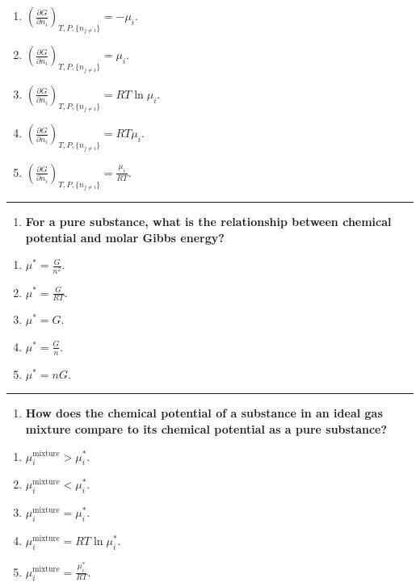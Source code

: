 \documentclass[
  9pt,
]{extbook}
\providecommand{\tightlist}{%
  \setlength{\itemsep}{0pt}\setlength{\parskip}{0pt}}
\theoremstyle{definition}
\theoremstyle{definition}
\theoremstyle{definition}
\theoremstyle{definition}
\theoremstyle{remark}
\begin{document}
\begin{enumerate}
\def\labelenumi{\alph{enumi}.}
\tightlist
\item
  \(\left(\frac{\partial G}{\partial n_i}\right)_{T,P,\{n_{j\neq i}\}} = -\mu_i\).
\item
  \(\left(\frac{\partial G}{\partial n_i}\right)_{T,P,\{n_{j\neq i}\}} = \mu_i\).
\item
  \(\left(\frac{\partial G}{\partial n_i}\right)_{T,P,\{n_{j\neq i}\}} = RT\ln\mu_i\).
\item
  \(\left(\frac{\partial G}{\partial n_i}\right)_{T,P,\{n_{j\neq i}\}} = RT\mu_i\).
\item
  \(\left(\frac{\partial G}{\partial n_i}\right)_{T,P,\{n_{j\neq i}\}} = \frac{\mu_i}{RT}\).
\end{enumerate}

\begin{center}\rule{0.5\linewidth}{0.5pt}\end{center}

\begin{enumerate}
\def\labelenumi{\arabic{enumi}.}
\setcounter{enumi}{7}
\tightlist
\item
  \textbf{For a pure substance, what is the relationship between chemical potential and molar Gibbs energy?}
\end{enumerate}

\begin{enumerate}
\def\labelenumi{\alph{enumi}.}
\tightlist
\item
  \(\mu^* = \frac{G}{n^2}\).
\item
  \(\mu^* = \frac{G}{RT}\).
\item
  \(\mu^* = G\).
\item
  \(\mu^* = \frac{G}{n}\).
\item
  \(\mu^* = nG\).
\end{enumerate}

\begin{center}\rule{0.5\linewidth}{0.5pt}\end{center}

\begin{enumerate}
\def\labelenumi{\arabic{enumi}.}
\setcounter{enumi}{8}
\tightlist
\item
  \textbf{How does the chemical potential of a substance in an ideal gas mixture compare to its chemical potential as a pure substance?}
\end{enumerate}

\begin{enumerate}
\def\labelenumi{\alph{enumi}.}
\tightlist
\item
  \(\mu_i^{\text{mixture}} > \mu_i^*\).
\item
  \(\mu_i^{\text{mixture}} < \mu_i^*\).
\item
  \(\mu_i^{\text{mixture}} = \mu_i^*\).
\item
  \(\mu_i^{\text{mixture}} = RT\ln\mu_i^*\).
\item
  \(\mu_i^{\text{mixture}} = \frac{\mu_i^*}{RT}\).
\end{enumerate}
\end{document}
